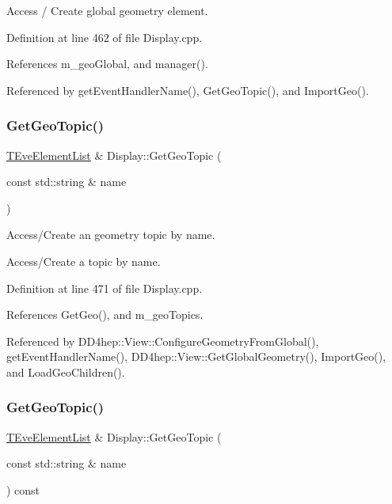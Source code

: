 Access / Create global geometry element. 



Definition at line 462 of file Display.\+cpp.



References m\+\_\+geo\+Global, and manager().



Referenced by get\+Event\+Handler\+Name(), Get\+Geo\+Topic(), and Import\+Geo().

\hypertarget{class_d_d4hep_1_1_display_a498d6b2e33dec5997afaa362815c5031}{}\label{class_d_d4hep_1_1_display_a498d6b2e33dec5997afaa362815c5031} 
\subsubsection{\texorpdfstring{Get\+Geo\+Topic()}{GetGeoTopic()}\hspace{0.1cm}{\footnotesize\ttfamily [1/2]}}
{\footnotesize\ttfamily \hyperlink{class_t_eve_element_list}{T\+Eve\+Element\+List} \& Display\+::\+Get\+Geo\+Topic (\begin{DoxyParamCaption}\item[{const std\+::string \&}]{name }\end{DoxyParamCaption})\hspace{0.3cm}{\ttfamily [virtual]}}



Access/\+Create an geometry topic by name. 

Access/\+Create a topic by name. 

Definition at line 471 of file Display.\+cpp.



References Get\+Geo(), and m\+\_\+geo\+Topics.



Referenced by D\+D4hep\+::\+View\+::\+Configure\+Geometry\+From\+Global(), get\+Event\+Handler\+Name(), D\+D4hep\+::\+View\+::\+Get\+Global\+Geometry(), Import\+Geo(), and Load\+Geo\+Children().

\hypertarget{class_d_d4hep_1_1_display_a466459e53efe1360d8917ee777d26f36}{}\label{class_d_d4hep_1_1_display_a466459e53efe1360d8917ee777d26f36} 
\subsubsection{\texorpdfstring{Get\+Geo\+Topic()}{GetGeoTopic()}\hspace{0.1cm}{\footnotesize\ttfamily [2/2]}}
{\footnotesize\ttfamily \hyperlink{class_t_eve_element_list}{T\+Eve\+Element\+List} \& Display\+::\+Get\+Geo\+Topic (\begin{DoxyParamCaption}\item[{const std\+::string \&}]{name }\end{DoxyParamCaption}) const\hspace{0.3cm}{\ttfamily [virtual]}}



